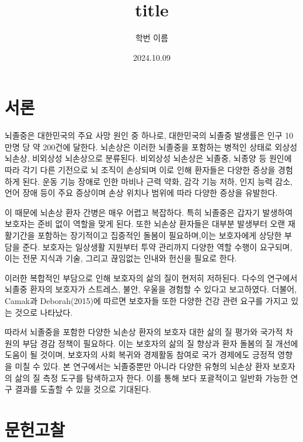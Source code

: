 \documentclass{article}
\title{title}
\author{학번 이름}
\date{2024.10.09}
\begin{document}
\onehalfspacing  %
\maketitle

\section{서론}

뇌졸중은 대한민국의 주요 사망 원인 중 하나로, 대한민국의 뇌졸중 발생률은 인구 10만명 당 약 200건에 달한다\cite{KOSIS}. 
뇌손상은 이러한 뇌졸중을 포함하는 병적인 상태로 외상성 뇌손상, 비외상성 뇌손상으로 분류된다\cite{giustini2013traumatic}.
비외상성 뇌손상은 뇌졸중, 뇌종양 등 원인에 따라 각기 다른 기전으로 뇌 조직이 손상되며 이로 인해 환자들은 다양한 증상을 경험하게 된다.
운동 기능 장애로 인한 마비나 근력 약화, 감각 기능 저하, 인지 능력 감소, 언어 장애 등이 주요 증상이며 손상 위치나 범위에 따라 다양한 증상을 유발한다.

이 때문에 뇌손상 환자 간병은 매우 어렵고 복잡하다.
특히 뇌졸중은 갑자기 발생하여 보호자는 준비 없이 역할을 맞게 된다\cite{lutz2011crisis}.
또한 뇌손상 환자들은 대부분 발생부터 오랜 재활기간을 포함하는 장기적이고 집중적인 돌봄이 필요하며,이는 보호자에게 상당한 부담을 준다.
보호자는 일상생활 지원부터 투약 관리까지 다양한 역할 수행이 요구되며, 이는 전문 지식과 기술, 그리고 끊임없는 인내와 헌신을 필요로 한다\citep{camak2015addressing}.

이러한 복합적인 부담으로 인해 보호자의 삶의 질이 현저히 저하된다. 다수의 연구에서 뇌졸중 환자의 보호자가 스트레스, 불안, 우울을 경험할 수 있다고 보고하였다\cite{denno2013anxiety,greenwood2010exploratory}.
더불어, Camak과 Deborah(2015)에 따르면 보호자들 또한 다양한 건강 관련 요구를 가지고 있는 것으로 나타났다\cite{camak2015addressing}.

따라서 뇌졸중을 포함한 다양한 뇌손상 환자의 보호자 대한 삶의 질 평가와 국가적 차원의 부담 경감 정책이 필요하다.
이는 보호자의 삶의 질 향상과 환자 돌봄의 질 개선에 도움이 될 것이며, 보호자의 사회 복귀와 경제활동 참여로 국가 경제에도 긍정적 영향을 미칠 수 있다. 
본 연구에서는 뇌졸중뿐만 아니라 다양한 유형의 뇌손상 환자 보호자의 삶의 질 측정 도구를 탐색하고자 한다. 이를 통해 보다 포괄적이고 일반화 가능한 연구 결과를 도출할 수 있을 것으로 기대된다.

\section{문헌고찰}
\end{document}
